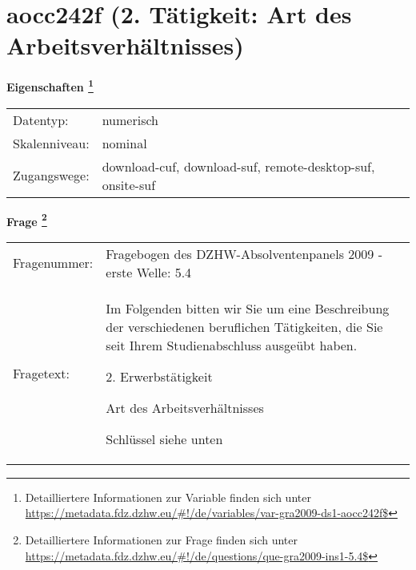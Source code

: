 
    \setcounter{footnote}{0}

    \vspace*{-1.8cm}
	\section{aocc242f (2. Tätigkeit: Art des Arbeitsverhältnisses)}
	\label{section:aocc242f}



    \vspace*{0.5cm}
    \noindent\textbf{Eigenschaften
	\footnote{Detailliertere Informationen zur Variable finden sich unter
		\url{https://metadata.fdz.dzhw.eu/\#!/de/variables/var-gra2009-ds1-aocc242f$}}}\\
	\begin{tabularx}{\hsize}{@{}lX}
	Datentyp: & numerisch \\
	Skalenniveau: & nominal \\
	Zugangswege: &
	  download-cuf, 
	  download-suf, 
	  remote-desktop-suf, 
	  onsite-suf
 \\
    \end{tabularx}



				\vspace*{0.5cm}
                \noindent\textbf{Frage
	                \footnote{Detailliertere Informationen zur Frage finden sich unter
		              \url{https://metadata.fdz.dzhw.eu/\#!/de/questions/que-gra2009-ins1-5.4$}}}\\
				\begin{tabularx}{\hsize}{@{}lX}
					Fragenummer: &
					  Fragebogen des DZHW-Absolventenpanels 2009 - erste Welle:
					  5.4
 \\
					Fragetext: & Im Folgenden bitten wir Sie um eine Beschreibung der verschiedenen beruflichen Tätigkeiten, die Sie seit Ihrem Studienabschluss ausgeübt haben.\par  2. Erwerbstätigkeit\par  Art des Arbeitsverhältnisses\par  Schlüssel siehe unten \\
				\end{tabularx}





